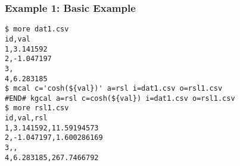 \subsubsection*{Example 1: Basic Example}



\begin{Verbatim}[baselinestretch=0.7,frame=single]
$ more dat1.csv
id,val
1,3.141592
2,-1.047197
3,
4,6.283185
$ mcal c='cosh(${val})' a=rsl i=dat1.csv o=rsl1.csv
#END# kgcal a=rsl c=cosh(${val}) i=dat1.csv o=rsl1.csv
$ more rsl1.csv
id,val,rsl
1,3.141592,11.59194573
2,-1.047197,1.600286169
3,,
4,6.283185,267.7466792
\end{Verbatim}
